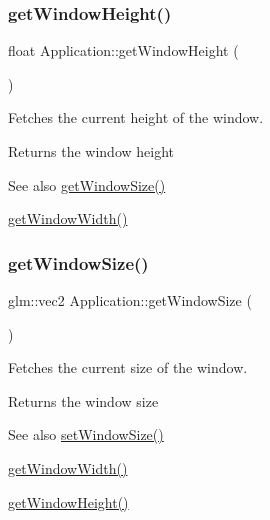 \subsubsection{\texorpdfstring{getWindowHeight()}{getWindowHeight()}}
{\footnotesize\ttfamily float Application\+::get\+Window\+Height (\begin{DoxyParamCaption}{ }\end{DoxyParamCaption})}



Fetches the current height of the window. 

\begin{DoxyReturn}{Returns}
the window height 
\end{DoxyReturn}
\begin{DoxySeeAlso}{See also}
\mbox{\hyperlink{classsage_1_1Application_ac0fa1750ee8dcacc37cc9eaed72f12f9}{get\+Window\+Size()}} 

\mbox{\hyperlink{classsage_1_1Application_ac67034adebee2a531f1da502b9ac4634}{get\+Window\+Width()}} 
\end{DoxySeeAlso}
\mbox{\label{classsage_1_1Application_ac0fa1750ee8dcacc37cc9eaed72f12f9}} 
\subsubsection{\texorpdfstring{getWindowSize()}{getWindowSize()}}
{\footnotesize\ttfamily glm\+::vec2 Application\+::get\+Window\+Size (\begin{DoxyParamCaption}{ }\end{DoxyParamCaption})}



Fetches the current size of the window. 

\begin{DoxyReturn}{Returns}
the window size 
\end{DoxyReturn}
\begin{DoxySeeAlso}{See also}
\mbox{\hyperlink{classsage_1_1Application_a991df90e69398b7fe8eeb0fa2df3d92e}{set\+Window\+Size()}} 

\mbox{\hyperlink{classsage_1_1Application_ac67034adebee2a531f1da502b9ac4634}{get\+Window\+Width()}} 

\mbox{\hyperlink{classsage_1_1Application_a20be3d592c9d2662051796420d0cd1d8}{get\+Window\+Height()}} 
\end{DoxySeeAlso}
\mbox{\label{classsage_1_1Application_ac67034adebee2a531f1da502b9ac4634}} 
